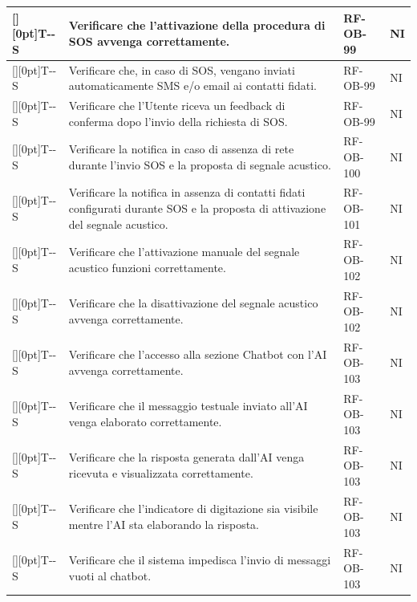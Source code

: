 \documentclass[a4paper,12pt]{article}
\newcounter{testsys}
\newcommand{\systestcode}{%
  \raisebox{0pt}[\height][0pt]{\hypertarget{T-\arabic{testsys}-S}{}}T-\arabic{testsys}-S%
}
\begin{document}
\begin{longtable}{| >{\centering\arraybackslash}p{} | >{\raggedright\arraybackslash}p{} | >{\centering\arraybackslash}p{} | >{\centering\arraybackslash}p{} |}
\stepcounter{testsys} \systestcode & Verificare che l'attivazione della procedura di SOS avvenga correttamente. & RF-OB-99 & NI \\
\hline

\stepcounter{testsys} \systestcode & Verificare che, in caso di SOS, vengano inviati automaticamente SMS e/o email ai contatti fidati. & RF-OB-99 & NI \\
\hline

\stepcounter{testsys} \systestcode & Verificare che l'Utente riceva un feedback di conferma dopo l'invio della richiesta di SOS. & RF-OB-99 & NI \\
\hline

\stepcounter{testsys} \systestcode & Verificare la notifica in caso di assenza di rete durante l'invio SOS e la proposta di segnale acustico. & RF-OB-100 & NI \\
\hline

\stepcounter{testsys} \systestcode & Verificare la notifica in assenza di contatti fidati configurati durante SOS e la proposta di attivazione del segnale acustico. & RF-OB-101 & NI \\
\hline

\stepcounter{testsys} \systestcode & Verificare che l'attivazione manuale del segnale acustico funzioni correttamente. & RF-OB-102 & NI \\
\hline

\stepcounter{testsys} \systestcode & Verificare che la disattivazione del segnale acustico avvenga correttamente. & RF-OB-102 & NI \\
\hline

\stepcounter{testsys} \systestcode & Verificare che l'accesso alla sezione Chatbot con l'AI avvenga correttamente. & RF-OB-103 & NI \\
\hline

\stepcounter{testsys} \systestcode & Verificare che il messaggio testuale inviato all'AI venga elaborato correttamente. & RF-OB-103 & NI \\
\hline

\stepcounter{testsys} \systestcode & Verificare che la risposta generata dall'AI venga ricevuta e visualizzata correttamente. & RF-OB-103 & NI \\
\hline

\stepcounter{testsys} \systestcode & Verificare che l'indicatore di digitazione sia visibile mentre l'AI sta elaborando la risposta. & RF-OB-103 & NI \\
\hline

\stepcounter{testsys} \systestcode & Verificare che il sistema impedisca l'invio di messaggi vuoti al chatbot. & RF-OB-103 & NI \\
\hline


\end{longtable}
\end{document}
